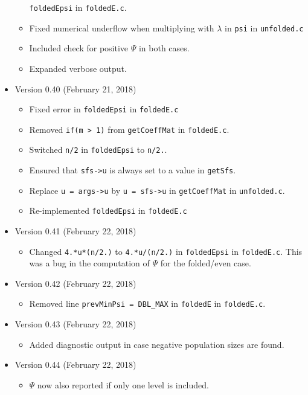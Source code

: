\documentclass[a4paper, english]{article}
\newcommand{\ty}{\texttt}
\begin{document}
\begin{itemize}
\begin{itemize}
    \ty{foldedEpsi} in \ty{foldedE.c}.
  \item Fixed numerical underflow when multiplying with $\lambda$ in
    \ty{psi} in \ty{unfolded.c}
  \item Included check for positive $\Psi$ in both cases.
  \item Expanded verbose output.
  \end{itemize}
\item Version 0.40 (February 21, 2018)
  \begin{itemize}
  \item Fixed error in \ty{foldedEpsi} in \ty{foldedE.c}
  \item Removed \ty{if(m > 1)} from \ty{getCoeffMat} in
    \ty{foldedE.c}.
  \item Switched \ty{n/2} in \ty{foldedEpsi} to \ty{n/2.}.
  \item Ensured that \ty{sfs->u} is always set to a value in
    \ty{getSfs}.
  \item Replace \verb+u = args->u+ by \verb+u = sfs->u+ in
    \ty{getCoeffMat} in \ty{unfolded.c}.
  \item Re-implemented \ty{foldedEpsi} in \ty{foldedE.c}
  \end{itemize}
\item Version 0.41 (February 22, 2018)
  \begin{itemize}
    \item Changed \ty{4.*u*(n/2.)} to \ty{4.*u/(n/2.)} in
      \ty{foldedEpsi} in \ty{foldedE.c}. This was a bug in the
      computation of $\Psi$ for the folded/even case.
  \end{itemize}
\item Version 0.42 (February 22, 2018)
  \begin{itemize}
    \item Removed line \ty{prevMinPsi = DBL\_MAX} in \ty{foldedE} in \ty{foldedE.c}.
  \end{itemize}
\item Version 0.43 (February 22, 2018)
  \begin{itemize}
    \item Added diagnostic output in case negative population sizes
      are found.
  \end{itemize}
\item Version 0.44 (February 22, 2018)
  \begin{itemize}
  \item $\Psi$ now also reported if only one level is included.
  \end{itemize}

\end{itemize}
\end{document}
